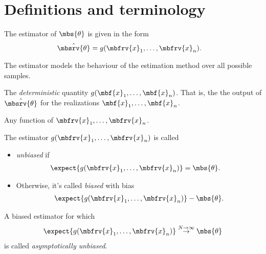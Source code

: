 \section{Definitions and terminology}
\begin{mydefinition}[Estimator]
    The estimator of $\mbs{\theta}$ is given in the form
    \begin{align}
        \hat{\mbsrv{\theta}} &= g(\mbfrv{x}_{1}, \ldots, \mbfrv{x}_{n}).
    \end{align}

    The estimator models the behaviour of the estimation method over all possible samples.
\end{mydefinition}
\begin{mydefinition}
    The \emph{deterministic} quantity $g(\mbf{x}_{1},\ldots,\mbf{x}_{n})$. That is, the the output of $\hat{\mbsrv{\theta}}$ for the realizations $\mbf{x}_{1}, \ldots, \mbf{x}_{n}$.
\end{mydefinition}
\begin{mydefinition}[Statistic]
    Any function of $\mbfrv{x}_{1}, \ldots, \mbfrv{x}_{n}$.
\end{mydefinition}
\begin{mydefinition}[Bias]
    The estimator $g(\mbfrv{x}_{1}, \ldots, \mbfrv{x}_{n})$ is called
    \begin{itemize}
        \item \emph{unbiased} if 
        \begin{align}
            \expect{g(\mbfrv{x}_{1},\ldots, \mbfrv{x}_{n})} &= \mbs{\theta}.
        \end{align}
        \item Otherwise, it's called \emph{biased} with bias
        \begin{align}
            \expect{g(\mbfrv{x}_{1},\ldots, \mbfrv{x}_{n})} - \mbs{\theta}.
        \end{align}
    \end{itemize}
\end{mydefinition}

\begin{mydefinition}
    A biased estimator for which
    \begin{align}
        \expect{g(\mbfrv{x}_{1},\ldots,\mbfrv{x}_{n})} \overset{N\to\infty}{\to} \mbs{\theta}
    \end{align}
    is called \emph{asymptotically unbiased}.
\end{mydefinition}

